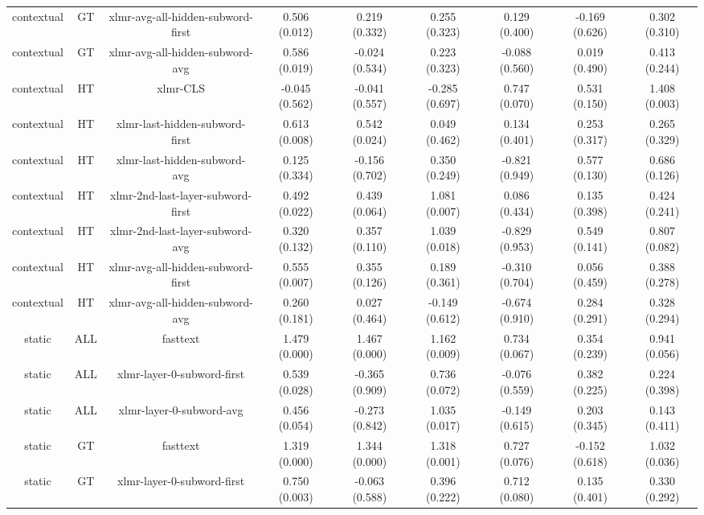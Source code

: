 \begin{sidewaystable}[htb]
\begin{tabular}{@{}ccccccccc@{}}
        contextual & GT & xlmr-avg-all-hidden-subword-first & 0.506 (0.012) & 0.219 (0.332) & 0.255 (0.323) & 0.129 (0.400) & -0.169 (0.626) & 0.302 (0.310) \\
        contextual & GT & xlmr-avg-all-hidden-subword-avg & 0.586 (0.019) & -0.024 (0.534) & 0.223 (0.323) & -0.088 (0.560) & 0.019 (0.490) & 0.413 (0.244) \\
        contextual & HT & xlmr-CLS & -0.045 (0.562) & -0.041 (0.557) & -0.285 (0.697) & 0.747 (0.070) & 0.531 (0.150) & 1.408 (0.003) \\
        contextual & HT & xlmr-last-hidden-subword-first & 0.613 (0.008) & 0.542 (0.024) & 0.049 (0.462) & 0.134 (0.401) & 0.253 (0.317) & 0.265 (0.329) \\
        contextual & HT & xlmr-last-hidden-subword-avg & 0.125 (0.334) & -0.156 (0.702) & 0.350 (0.249) & -0.821 (0.949) & 0.577 (0.130) & 0.686 (0.126) \\
        contextual & HT & xlmr-2nd-last-layer-subword-first & 0.492 (0.022) & 0.439 (0.064) & 1.081 (0.007) & 0.086 (0.434) & 0.135 (0.398) & 0.424 (0.241) \\
        contextual & HT & xlmr-2nd-last-layer-subword-avg & 0.320 (0.132) & 0.357 (0.110) & 1.039 (0.018) & -0.829 (0.953) & 0.549 (0.141) & 0.807 (0.082) \\
        contextual & HT & xlmr-avg-all-hidden-subword-first & 0.555 (0.007) & 0.355 (0.126) & 0.189 (0.361) & -0.310 (0.704) & 0.056 (0.459) & 0.388 (0.278) \\
        contextual & HT & xlmr-avg-all-hidden-subword-avg & 0.260 (0.181) & 0.027 (0.464) & -0.149 (0.612) & -0.674 (0.910) & 0.284 (0.291) & 0.328 (0.294) \\
        static & ALL & fasttext & 1.479 (0.000) & 1.467 (0.000) & 1.162 (0.009) & 0.734 (0.067) & 0.354 (0.239) & 0.941 (0.056) \\
        static & ALL & xlmr-layer-0-subword-first & 0.539 (0.028) & -0.365 (0.909) & 0.736 (0.072) & -0.076 (0.559) & 0.382 (0.225) & 0.224 (0.398) \\
        static & ALL & xlmr-layer-0-subword-avg & 0.456 (0.054) & -0.273 (0.842) & 1.035 (0.017) & -0.149 (0.615) & 0.203 (0.345) & 0.143 (0.411) \\
        static & GT & fasttext & 1.319 (0.000) & 1.344 (0.000) & 1.318 (0.001) & 0.727 (0.076) & -0.152 (0.618) & 1.032 (0.036) \\
        static & GT & xlmr-layer-0-subword-first & 0.750 (0.003) & -0.063 (0.588) & 0.396 (0.222) & 0.712 (0.080) & 0.135 (0.401) & 0.330 (0.292) \\

\end{tabular}
\end{sidewaystable}
